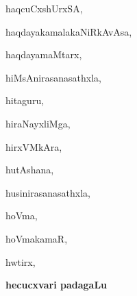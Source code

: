 \begin{multicols}{3}
{\noindent
{haqcuCxshUrxSA}, \pageref{haqcuCxshUrxSA}

\noindent
{haqdayakamalakaNiRkAvAsa}, \pageref{haqdayakamalakaNiRkAvAsa}

\noindent
{haqdayamaMtarx}, \pageref{haqdayamaMtarx}

\noindent
{hiMsAnirasanasathxla}, \pageref{hiMsAnirasanasathxla}

\noindent
{hitaguru}, \pageref{hitaguru}

\noindent
{hiraNayxliMga}, \pageref{hiraNayxliMga}

\noindent
{hirxVMkAra}, \pageref{hirxVMkAra}

\noindent
{hutAshana}, \pageref{hutAshana}

\noindent
{husinirasanasathxla}, \pageref{husinirasanasathxla}

\noindent
{hoVma}, \pageref{hoVma}

\noindent
{hoVmakamaR}, \pageref{hoVmakamaR}

\noindent
{hwtirx}, \pageref{hwtirx}
}
\end{multicols}

\noindent
\vskip 1cm

\noindent
\begin{center}
{\Large\bfseries hecucxvari padagaLu}
\end{center}
\medskip

